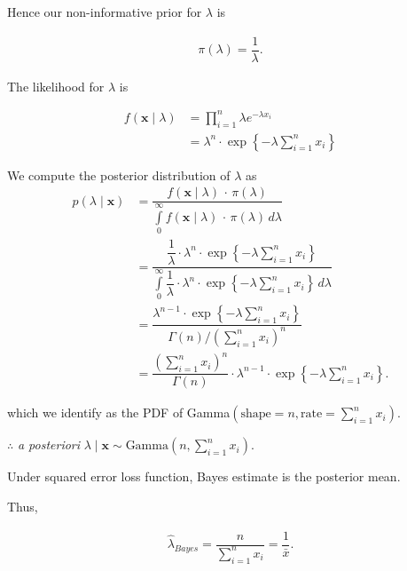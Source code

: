 \documentclass[12pt, a4paper]{article}
\begin{document}
\newpage

Hence our non-informative prior for $\lambda$ is

\begin{align*}
\pi(\lambda) = \dfrac{1}{\lambda}.
\end{align*}

The likelihood for $\lambda$ is

\begin{align*}
f(\mathbf{x} \mid \lambda) &= \prod \limits_{i = 1}^{n} \lambda e^{-\lambda x_i} \\[1em]
&= \lambda^n \cdot \exp \left\{ - \lambda \sum \limits_{i = 1}^{n} x_i \right\}
\end{align*}

We compute the posterior distribution of $\lambda$ as
\begin{align*}
p(\lambda \mid \mathbf{x}) &= \dfrac{f(\mathbf{x} \mid \lambda) \, \cdot \, \pi(\lambda)}{\displaystyle \int\limits_{0}^{\infty} f(\mathbf{x} \mid \lambda) \, \cdot \, \pi(\lambda) \, d\lambda} \\[1em]
&= \dfrac{\dfrac{1}{\lambda} \cdot \lambda^n \cdot \exp \left\{ - \lambda \sum \limits_{i = 1}^{n} x_i \right\}}{\displaystyle{\int \limits_{0}^{\infty} \dfrac{1}{\lambda} \cdot \lambda^n \cdot \exp \left\{ - \lambda \sum \limits_{i = 1}^{n} x_i \right\}} \, d\lambda} \\[1em]
&= \dfrac{\lambda^{n-1} \cdot \exp \left\{ - \lambda \sum \limits_{i = 1}^{n} x_i \right\}}{\Gamma(n) \Big/ \left( \sum
 \limits_{i = 1}^{n} x_i \right)^n} \\[1em]
&= \dfrac{\left( \sum \limits_{i = 1}^{n} x_i \right)^n}{\Gamma(n)} \cdot \lambda^{n-1} \cdot \exp \left\{ - \lambda \sum \limits_{i = 1}^{n} x_i \right\}.
\end{align*}

which we identify as the PDF of Gamma$\left(\text{shape} = n, \text{rate} = \sum \limits_{i = 1}^{n} x_i\right)$.

\vspace{0.5cm}

$\therefore$ \textit{a posteriori} $\lambda \mid \mathbf{x} \sim \text{Gamma}\left(n, \sum \limits_{i = 1}^{n} x_i \right)$.

\vspace{0.5cm}

{\fontsize{12}{20} \gloriahallelujahfont Under squared error loss function, Bayes estimate is the posterior mean.}

\vspace{0.5cm}

Thus,

\begin{align*}
\hat{\lambda}_{Bayes} = \dfrac{n}{\sum \limits_{i = 1}^{n} x_i} = \dfrac{1}{\bar{x}}.
\end{align*}
\end{document}
